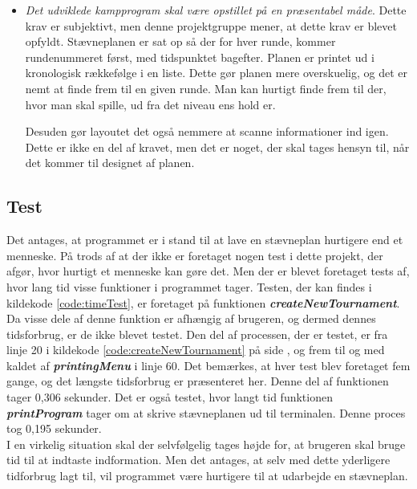\begin{itemize}
    \item \textit{Det udviklede kampprogram skal være opstillet på en præsentabel måde}. Dette krav er subjektivt, men denne projektgruppe mener, at dette krav er blevet opfyldt. Stævneplanen er sat op så der for hver runde, kommer rundenummeret først, med tidspunktet bagefter. Planen er printet ud i kronologisk rækkefølge i en liste. Dette gør planen mere overskuelig, og det er nemt at finde frem til en given runde. Man kan hurtigt finde frem til der, hvor man skal spille, ud fra det niveau ens hold er. 
    \par
    Desuden gør layoutet det også nemmere at scanne informationer ind igen. Dette er ikke en del af kravet, men det er noget, der skal tages hensyn til, når det kommer til designet af planen.
\end{itemize}



\subsection*{Test}
Det antages, at programmet er i stand til at lave en stævneplan hurtigere end et menneske. På trods af at der ikke er foretaget nogen test i dette projekt, der afgør, hvor hurtigt et menneske kan gøre det. Men der er blevet foretaget tests af, hvor lang tid visse funktioner i programmet tager. Testen, der kan findes i kildekode \ref{code:timeTest}, er foretaget på funktionen \textbf{\textit{createNewTournament}}. Da visse dele af denne funktion er afhængig af brugeren, og dermed dennes tidsforbrug, er de ikke blevet testet. Den del af processen, der er testet, er fra linje 20 i kildekode \ref{code:createNewTournament} på side \pageref{code:createNewTournament}, og frem til og med kaldet af \textbf{\textit{printingMenu}} i linje 60. Det bemærkes, at hver test blev foretaget fem gange, og det længste tidsforbrug er præsenteret her. Denne del af funktionen tager 0,306 sekunder. Det er også testet, hvor langt tid funktionen \textbf{\textit{printProgram}} tager om at skrive stævneplanen ud til terminalen. Denne proces tog 0,195 sekunder.
\\
I en virkelig situation skal der selvfølgelig tages højde for, at brugeren skal bruge tid til at indtaste indformation. Men det antages, at selv med dette yderligere tidforbrug lagt til, vil programmet være hurtigere til at udarbejde en stævneplan.

